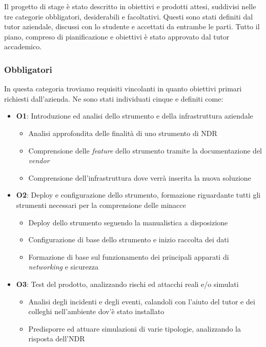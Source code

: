 Il progetto di stage è stato descritto in obiettivi e prodotti attesi, suddivisi nelle tre categorie obbligatori, desiderabili e facoltativi. Questi sono stati definiti dal tutor aziendale, discussi con lo studente e accettati da entrambe le parti. Tutto il piano, compreso di pianificazione e obiettivi è stato approvato dal tutor accademico.

\subsubsection{Obbligatori}

In questa categoria troviamo requisiti vincolanti in quanto obiettivi primari richiesti dall'azienda. Ne sono stati individuati cinque e definiti come:

\begin{itemize}
    \item \textbf{O1}: Introduzione ed analisi dello strumento e della infrastruttura aziendale
    \begin{itemize}
        \item Analisi approfondita delle finalità di uno strumento di NDR
        \item Comprensione delle \emph{feature} dello strumento tramite la documentazione del \emph{vendor}
        \item Comprensione dell'infrastruttura dove verrà inserita la nuova soluzione
    \end{itemize}
    \item \textbf{O2}: Deploy e configurazione dello strumento, formazione riguardante tutti gli strumenti necessari per la comprensione delle minacce
    \begin{itemize}
        \item Deploy dello strumento seguendo la manualistica a disposizione
        \item Configurazione di base dello strumento e inizio raccolta dei dati
        \item Formazione di base sul funzionamento dei principali apparati di \emph{networking} e sicurezza
    \end{itemize}
    \item \textbf{O3}: Test del prodotto, analizzando rischi ed attacchi reali e/o simulati
    \begin{itemize}
        \item Analisi degli incidenti e degli eventi, calandoli con l'aiuto del tutor e dei colleghi nell'ambiente dov'è stato installato
        \item Predisporre ed attuare simulazioni di varie tipologie, analizzando la risposta dell'NDR

\end{itemize}
\end{itemize}
